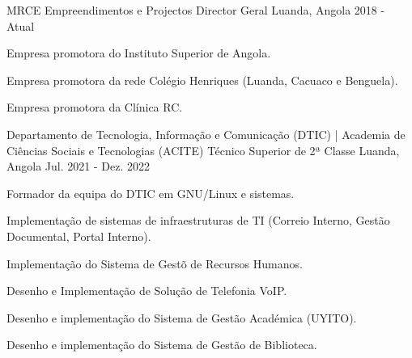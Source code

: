 \begin{cventries}

\cventry
{MRCE Empreendimentos e Projectos} %
{Director Geral} %
{Luanda, Angola} %
{2018 - Atual} %
{ %
\begin{cvitems}
    \item {Empresa promotora do Instituto Superior de Angola.}
    \item {Empresa promotora da rede Colégio Henriques (Luanda, Cacuaco e Benguela).}
    \item {Empresa promotora da Clínica RC.}
\end{cvitems}
}


\cventry
{Departamento de Tecnologia, Informação e Comunicação (DTIC) | Academia de Ciências Sociais e Tecnologias (ACITE)} %
{Técnico Superior de 2ª Classe} %
{Luanda, Angola} %
{Jul. 2021 - Dez. 2022} %
{ %
\begin{cvitems}
    \item Formador da equipa do DTIC em GNU/Linux e sistemas.
    \item Implementação de sistemas de infraestruturas de TI (Correio Interno, Gestão Documental, Portal Interno).
    \item Implementação do Sistema de Gestõ de Recursos Humanos.
    \item Desenho e Implementação de Solução de Telefonia VoIP.
    \item Desenho e implementação do Sistema de Gestão Académica (UYITO).
    \item Desenho e implementação do Sistema de Gestão de Biblioteca.
\end{cvitems}
}



\end{cventries}
